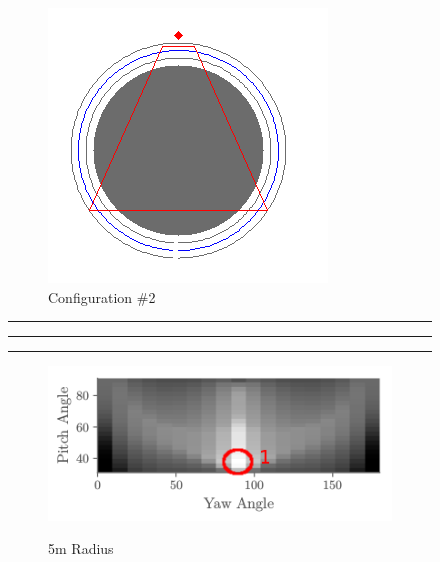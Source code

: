 \documentclass[a4paper,12pt,twoside,openright]{report}
\begin{document}
\begin{figure}[h!]
\begin{subfigure}[b]{0.28\textwidth}
    \includegraphics[width=\textwidth]{figures/simple_objective/radius_20m_pos2_small.png}
    \caption{Configuration \#2}
\end{subfigure}
\hrule
\hrule
\hrule
\begin{subfigure}[b]{0.45\textwidth}
    \centering
    \includegraphics[width=\textwidth]{figures/simple_objective/pitch_yaw_at_radius_5_annotated.png}
    \label{fig:simpleobjective:20radius}
    \caption{5m Radius}
\end{subfigure}
\begin{subfigure}[b]{0.25\textwidth}
    \centering

\end{subfigure}
\end{figure}
\end{document}
